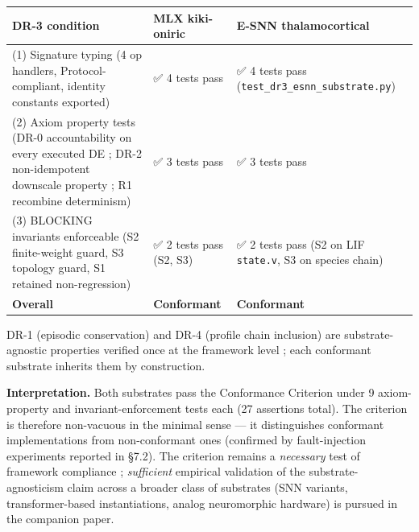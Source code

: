 \documentclass[
]{article}
\newcounter{none} %
\begin{document}
{\def\LTcaptype{none} %
\begin{longtable}[]{@{}
  >{\raggedright\arraybackslash}p{}
  >{\raggedright\arraybackslash}p{}
  >{\raggedright\arraybackslash}p{}@{}}
\toprule\noalign{}
\begin{minipage}[b]{\linewidth}\raggedright
DR-3 condition
\end{minipage} & \begin{minipage}[b]{\linewidth}\raggedright
MLX kiki-oniric
\end{minipage} & \begin{minipage}[b]{\linewidth}\raggedright
E-SNN thalamocortical
\end{minipage} \\
\midrule\noalign{}
\endhead
\bottomrule\noalign{}
\endlastfoot
(1) Signature typing (4 op handlers, Protocol-compliant, identity
constants exported) & ✅ 4 tests pass & ✅ 4 tests pass
(\texttt{test\_dr3\_esnn\_substrate.py}) \\
(2) Axiom property tests (DR-0 accountability on every executed DE ;
DR-2 non-idempotent downscale property ; R1 recombine determinism) & ✅
3 tests pass & ✅ 3 tests pass \\
(3) BLOCKING invariants enforceable (S2 finite-weight guard, S3 topology
guard, S1 retained non-regression) & ✅ 2 tests pass (S2, S3) & ✅ 2
tests pass (S2 on LIF \texttt{state.v}, S3 on species chain) \\
\textbf{Overall} & \textbf{Conformant} & \textbf{Conformant} \\
\end{longtable}
}

DR-1 (episodic conservation) and DR-4 (profile chain inclusion) are
substrate-agnostic properties verified once at the framework level ;
each conformant substrate inherits them by construction.

\textbf{Interpretation.} Both substrates pass the Conformance Criterion
under 9 axiom-property and invariant-enforcement tests each (27
assertions total). The criterion is therefore non-vacuous in the minimal
sense --- it distinguishes conformant implementations from
non-conformant ones (confirmed by fault-injection experiments reported
in §7.2). The criterion remains a \emph{necessary} test of framework
compliance ; \emph{sufficient} empirical validation of the
substrate-agnosticism claim across a broader class of substrates (SNN
variants, transformer-based instantiations, analog neuromorphic
hardware) is pursued in the companion paper.
\end{document}
